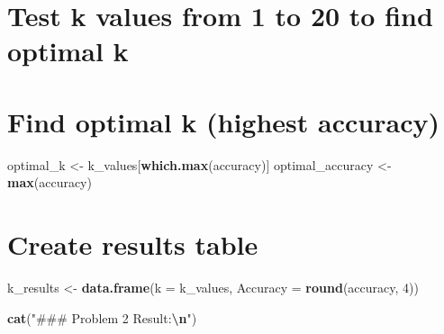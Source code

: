 \documentclass[
]{article}
\newenvironment{Shaded}{\begin{snugshade}}{\end{snugshade}}
\newcommand{\AttributeTok}[1]{\textcolor[rgb]{0.13,0.29,0.53}{#1}}
\newcommand{\ControlFlowTok}[1]{\textcolor[rgb]{0.13,0.29,0.53}{\textbf{#1}}}
\newcommand{\DecValTok}[1]{\textcolor[rgb]{0.00,0.00,0.81}{#1}}
\newcommand{\FunctionTok}[1]{\textcolor[rgb]{0.13,0.29,0.53}{\textbf{#1}}}
\newcommand{\NormalTok}[1]{#1}
\newcommand{\OtherTok}[1]{\textcolor[rgb]{0.56,0.35,0.01}{#1}}
\newcommand{\SpecialCharTok}[1]{\textcolor[rgb]{0.81,0.36,0.00}{\textbf{#1}}}
\newcommand{\StringTok}[1]{\textcolor[rgb]{0.31,0.60,0.02}{#1}}
\begin{document}
\section{Test k values from 1 to 20 to find optimal
k}\label{test-k-values-from-1-to-20-to-find-optimal-k}

\begin{Shaded}
\end{Shaded}

\section{Find optimal k (highest
accuracy)}\label{find-optimal-k-highest-accuracy}

\begin{Shaded}
\begin{Highlighting}[]
\NormalTok{optimal\_k }\OtherTok{\textless{}{-}}\NormalTok{ k\_values[}\FunctionTok{which.max}\NormalTok{(accuracy)]}
\NormalTok{optimal\_accuracy }\OtherTok{\textless{}{-}} \FunctionTok{max}\NormalTok{(accuracy)}
\end{Highlighting}
\end{Shaded}

\section{Create results table}\label{create-results-table}

\begin{Shaded}
\begin{Highlighting}[]
\NormalTok{k\_results }\OtherTok{\textless{}{-}} \FunctionTok{data.frame}\NormalTok{(}\AttributeTok{k =}\NormalTok{ k\_values, }\AttributeTok{Accuracy =} \FunctionTok{round}\NormalTok{(accuracy, }\DecValTok{4}\NormalTok{))}

\FunctionTok{cat}\NormalTok{(}\StringTok{"\#\#\# Problem 2 Result:}\SpecialCharTok{\textbackslash{}n}\StringTok{"}\NormalTok{)}
\end{Highlighting}
\end{Shaded}
\end{document}
